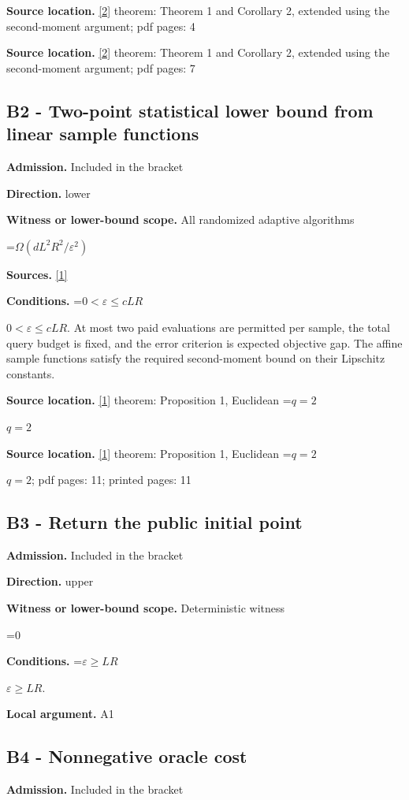 \documentclass[10pt,a4paper]{article}
\newcommand{\AtlasMath}[1]{\par\begingroup\centering\setbox0=\hbox{$\displaystyle #1$}\ifdim\wd0>1.4\linewidth\typeout{ATLAS WIDE FORMULA: \the\wd0}\fi\ifdim\wd0>\linewidth\resizebox{\linewidth}{!}{\box0}\else\box0\fi\par\endgroup}
\newcommand{\AtlasInlineMath}[1]{\begingroup\setbox0=\hbox{$#1$}\ifdim\wd0>.4\linewidth\endgroup\AtlasMath{#1}\else\endgroup$#1$\fi}
\begin{document}
\textbf{Source location.} \href{https://jmlr.org/papers/volume18/16-632/16-632.pdf}{[2]} theorem: Theorem 1 and Corollary 2, extended using the second-moment argument; pdf pages: 4

\textbf{Source location.} \href{https://jmlr.org/papers/volume18/16-632/16-632.pdf}{[2]} theorem: Theorem 1 and Corollary 2, extended using the second-moment argument; pdf pages: 7

\subsection{B2 - Two-point statistical lower bound from linear sample functions}
\textbf{Admission.} Included in the bracket

\textbf{Direction.} lower

\textbf{Witness or lower-bound scope.} All randomized adaptive algorithms

\AtlasMath{\Omega(dL^2R^2/\varepsilon^2)}
\textbf{Sources.} \href{https://arxiv.org/html/1312.2139v2}{[1]}

\textbf{Conditions.} \AtlasInlineMath{0<\varepsilon\le cLR}. At most two paid evaluations are permitted per sample, the total query budget is fixed, and the error criterion is expected objective gap. The affine sample functions satisfy the required second-moment bound on their Lipschitz constants.

\textbf{Source location.} \href{https://arxiv.org/html/1312.2139v2}{[1]} theorem: Proposition 1, Euclidean \AtlasInlineMath{q=2}

\textbf{Source location.} \href{https://arxiv.org/html/1312.2139v2}{[1]} theorem: Proposition 1, Euclidean \AtlasInlineMath{q=2}; pdf pages: 11; printed pages: 11

\subsection{B3 - Return the public initial point}
\textbf{Admission.} Included in the bracket

\textbf{Direction.} upper

\textbf{Witness or lower-bound scope.} Deterministic witness

\AtlasMath{0}
\textbf{Conditions.} \AtlasInlineMath{\varepsilon\ge LR}.

\textbf{Local argument.} A1

\subsection{B4 - Nonnegative oracle cost}
\textbf{Admission.} Included in the bracket
\end{document}
